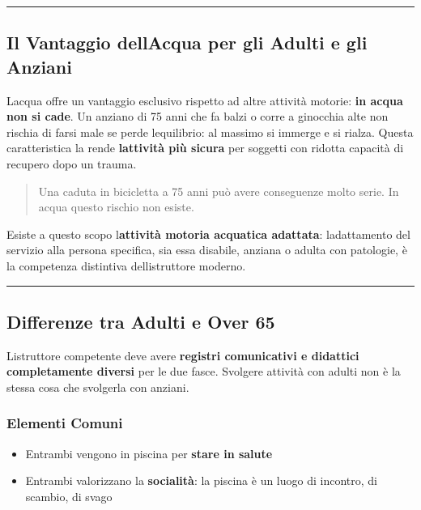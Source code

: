 \documentclass[a4paper,11pt]{article}
\providecommand{\tightlist}{%
  \setlength{\itemsep}{0pt}\setlength{\parskip}{0pt}}
\begin{document}
\begin{center}\rule{0.5\linewidth}{0.5pt}\end{center}

\subsection{Il Vantaggio dell\textquotesingle Acqua per gli Adulti e gli
      Anziani}\label{il-vantaggio-dellacqua-per-gli-adulti-e-gli-anziani}

L\textquotesingle acqua offre un vantaggio esclusivo rispetto ad altre
attività motorie: \textbf{in acqua non si cade}. Un anziano di 75 anni
che fa balzi o corre a ginocchia alte non rischia di farsi male se perde
l\textquotesingle equilibrio: al massimo si immerge e si rialza. Questa
caratteristica la rende \textbf{l\textquotesingle attività più sicura}
per soggetti con ridotta capacità di recupero dopo un trauma.

\begin{quote}
      Una caduta in bicicletta a 75 anni può avere conseguenze molto serie. In
      acqua questo rischio non esiste.
\end{quote}

Esiste a questo scopo l\textquotesingle{}\textbf{attività motoria
      acquatica adattata}: l\textquotesingle adattamento del servizio alla
persona specifica, sia essa disabile, anziana o adulta con patologie, è
la competenza distintiva dell\textquotesingle istruttore moderno.

\begin{center}\rule{0.5\linewidth}{0.5pt}\end{center}

\subsection{Differenze tra Adulti e Over
      65}\label{differenze-tra-adulti-e-over-65}

L\textquotesingle istruttore competente deve avere \textbf{registri
      comunicativi e didattici completamente diversi} per le due fasce.
Svolgere attività con adulti non è la stessa cosa che svolgerla con
anziani.

\subsubsection{Elementi Comuni}\label{elementi-comuni}

\begin{itemize}
      \tightlist
      \item
            Entrambi vengono in piscina per \textbf{stare in salute}
      \item
            Entrambi valorizzano la \textbf{socialità}: la piscina è un luogo di
            incontro, di scambio, di svago
\end{itemize}
\end{document}
